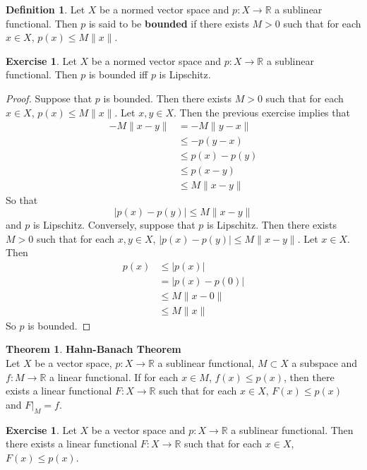 \documentclass[12pt]{amsart}
\theoremstyle{definition}
\newtheorem{defn}[definition]{Definition}
\newtheorem{thm}[definition]{Theorem}
\newtheorem{ex}[definition]{Exercise}
\newcommand{\R}{\mathbb{R}}
\begin{document}
	\begin{defn}
	Let $X$ be a normed vector space and $p:X \rightarrow \R$ a sublinear functional. Then $p$ is said to be \textbf{bounded} if there exists $M >0$ such that for each $x \in X$, $p(x) \leq M\|x\|$. 
	\end{defn}
	
	\begin{ex}
	Let $X$ be a normed vector space and $p:X \rightarrow \R$ a sublinear functional. Then $p$ is bounded iff $p$ is Lipschitz. 
	\end{ex}
	
	\begin{proof}
	Suppose that $p$ is bounded. Then there exists $M >0$ such that for each $x \in X$, $p(x) \leq M\|x\|$. Let $x, y \in X$. Then the previous exercise implies that 
	\begin{align*}
	-M\|x-y\| 
	&= -M\|y-x\| \\
	& \leq -p(y-x) \\
	& \leq p(x)-p(y) \\
	& \leq p(x-y) \\
	& \leq M \| x-y\| 
	\end{align*}
	So that $$|p(x) - p(y)| \leq  M\|x-y\|$$
	and $p$ is Lipschitz.
	Conversely, suppose that $p$ is Lipschitz. Then there exists $M >0 $ such that for each $x ,y \in X$, $|p(x) - p(y)| \leq  M\|x-y\|$. Let $x \in X$. Then 
	\begin{align*}
	p(x) 
	& \leq |p(x)| \\
	& = |p(x) - p(0)| \\
	& \leq M\|x - 0\| \\
	  & \leq M\|x\| 
	\end{align*}
	So $p$ is bounded.
	\end{proof}
	
	\begin{thm}\textbf{Hahn-Banach Theorem}\\
		Let $X$ be a vector space, $p:X \rightarrow \R$ a sublinear functional, $M \subset X$ a subspace and $f:M \rightarrow \R$ a linear functional. If for each $x \in M$, $ f(x)  \leq p(x)$, then there exists a linear functional $F:X \rightarrow \R$ such that for each $x \in X$, $F(x) \leq p(x)$ and $F|_{M}=f$.
	\end{thm}
	
	\begin{ex}
	Let $X$ be a vector space and $p:X \rightarrow \R$ a sublinear functional. Then there exists a linear functional $F: X \rightarrow \R$ such that for each $x \in X$, $F(x) \leq p(x)$.
	\end{ex}
	
\end{document}
